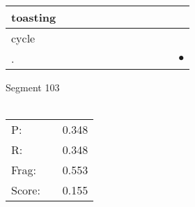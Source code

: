 \documentclass[landscape]{article}
\newcommand{\ssp}{\hspace{2pt}}
\newcommand{\mex}{\cellcolor{g}$\bullet$}
\begin{document}
\begin{tabular}{|l|p{10pt}|p{10pt}|p{10pt}|p{10pt}|p{10pt}|p{10pt}|p{10pt}|p{10pt}|p{10pt}|p{10pt}|p{10pt}|}
\hline
\ssp toasting \ssp&\hspace{2pt}&\hspace{2pt}&\hspace{2pt}&\hspace{2pt}&\hspace{2pt}&\hspace{2pt}&\hspace{2pt}&\hspace{2pt}&\hspace{2pt}&\hspace{2pt}&\hspace{2pt}\\
\hline
\ssp cycle \ssp&\hspace{2pt}&\hspace{2pt}&\hspace{2pt}&\hspace{2pt}&\hspace{2pt}&\hspace{2pt}&\hspace{2pt}&\hspace{2pt}&\hspace{2pt}&\hspace{2pt}&\hspace{2pt}\\
\hline
\ssp \cellcolor{ref10}. \ssp&\hspace{2pt}&\hspace{2pt}&\hspace{2pt}&\hspace{2pt}&\hspace{2pt}&\hspace{2pt}&\hspace{2pt}&\hspace{2pt}&\hspace{2pt}&\hspace{2pt}&\hspace{2pt}\mex\\
\hline
\end{tabular}

\vspace{6pt}
\noindent Segment 103\\\\
\noindent\begin{tabular}{lm{12pt}r}
\hline
P:&&0.348\\
R:&&0.348\\
Frag:&&0.553\\
Score:&&0.155\\
\end{tabular}
\end{document}
